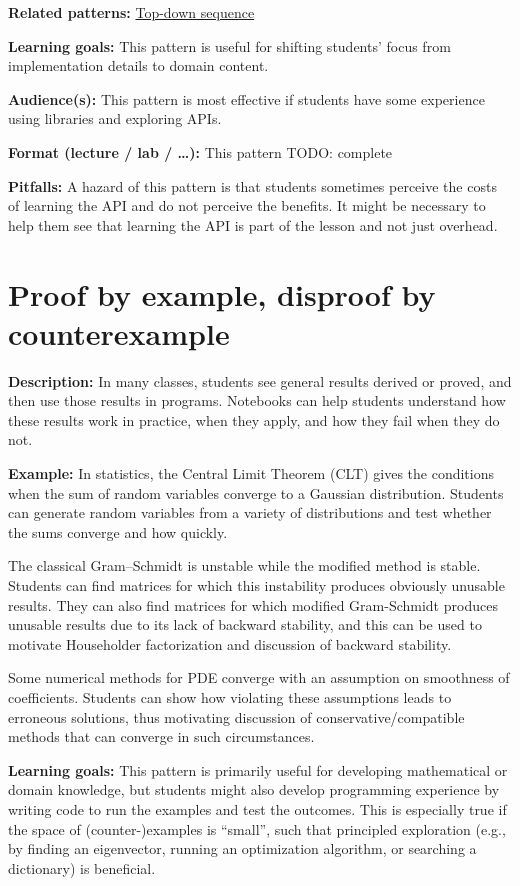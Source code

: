 \documentclass[]{book}
\begin{document}
\textbf{Related patterns:}
\protect\hyperlink{top-down-sequence}{Top-down sequence}

\textbf{Learning goals:}
This pattern is useful for shifting students' focus from implementation details
to domain content.

\textbf{Audience(s):}
This pattern is most effective if students have some experience using libraries
and exploring APIs.

\textbf{Format (lecture / lab / \ldots):}
This pattern
TODO: complete

\textbf{Pitfalls:}
A hazard of this pattern is that students sometimes perceive the costs of learning the
API and do not perceive the benefits. It might be necessary to help them see that
learning the API is part of the lesson and not just overhead.

\hypertarget{proof-by-example-disproof-by-counterexample}{%
\section{Proof by example, disproof by counterexample}\label{proof-by-example-disproof-by-counterexample}}

\textbf{Description:}
In many classes, students see general results derived or proved, and then use those
results in programs. Notebooks can help students understand how these results work
in practice, when they apply, and how they fail when they do not.

\textbf{Example:}
In statistics, the Central Limit Theorem (CLT) gives the conditions when the
sum of random variables converge to a Gaussian distribution. Students can
generate random variables from a variety of distributions and test whether the
sums converge and how quickly.

The classical Gram--Schmidt is unstable while the modified method is stable.
Students can find matrices for which this instability produces obviously unusable results.
They can also find matrices for which modified Gram-Schmidt produces unusable results due
to its lack of backward stability, and this can be used to motivate Householder factorization
and discussion of backward stability.

Some numerical methods for PDE converge with an assumption on smoothness of
coefficients. Students can show how violating these assumptions leads to
erroneous solutions, thus motivating discussion of conservative/compatible
methods that can converge in such circumstances.

\textbf{Learning goals:}
This pattern is primarily useful for developing mathematical or domain knowledge,
but students might also develop programming experience by writing code to run the
examples and test the outcomes. This is especially true if the space of
(counter-)examples is ``small'', such that principled exploration (e.g., by finding an
eigenvector, running an optimization algorithm, or searching a dictionary) is beneficial.
\end{document}
